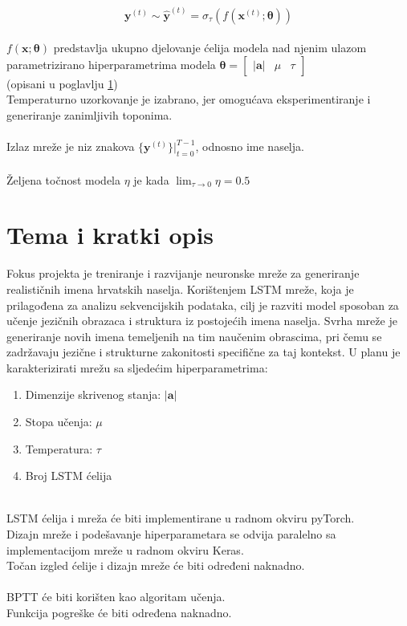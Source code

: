 \documentclass{report}
\begin{document}
\begin{equation}
 \mathbf{y}^{(t)} \sim \hat{\mathbf{y}}^{(t)} = \sigma_{\tau}(f(\mathbf{x}^{(t)} ; \boldsymbol{\theta}))
\end{equation}
\ \\
$f(\mathbf{x} ; \boldsymbol{\theta})$ predstavlja ukupno djelovanje ćelija modela nad njenim ulazom parametrizirano hiperparametrima modela $\boldsymbol{\theta} = \begin{bmatrix} \lvert \mathbf{a} \rvert & \mu & \tau \end{bmatrix}$\\ (opisani u poglavlju \ref{sec_tema})
\ \\
Temperaturno uzorkovanje je izabrano, jer omogućava eksperimentiranje i generiranje zanimljivih toponima.\\
\\
Izlaz mreže je niz znakova $\{\mathbf{y}^{(t)}\} \biggr \rvert_{t=0}^{T-1}$, odnosno ime naselja.\\
\\
Željena točnost modela $\eta$ je kada $\lim_{\tau \to 0} \eta = 0.5$

\section{Tema i kratki opis}
\label{sec_tema}
Fokus projekta je treniranje i razvijanje neuronske mreže za generiranje realističnih imena hrvatskih naselja. Korištenjem LSTM mreže, koja je prilagođena za analizu sekvencijskih podataka, cilj je razviti model sposoban za učenje jezičnih obrazaca i struktura iz postojećih imena naselja. Svrha mreže je generiranje novih imena temeljenih na tim naučenim obrascima, pri čemu se zadržavaju jezične i strukturne zakonitosti specifične za taj kontekst. U planu je karakterizirati mrežu sa sljedećim hiperparametrima:
\begin{enumerate}
\item Dimenzije skrivenog stanja: $\lvert \mathbf{a} \rvert$
\item Stopa učenja: $\mu$
\item Temperatura: $\tau$
\item Broj LSTM ćelija
\end{enumerate}
\ \\
LSTM ćelija i mreža će biti implementirane u radnom okviru pyTorch.\\
Dizajn mreže i podešavanje hiperparametara se odvija paralelno sa implementacijom mreže u radnom okviru Keras.\\
Točan izgled ćelije i dizajn mreže će biti određeni naknadno.\\
\\
BPTT će biti korišten kao algoritam učenja.\\
Funkcija pogreške će biti određena naknadno.\\
\end{document}
